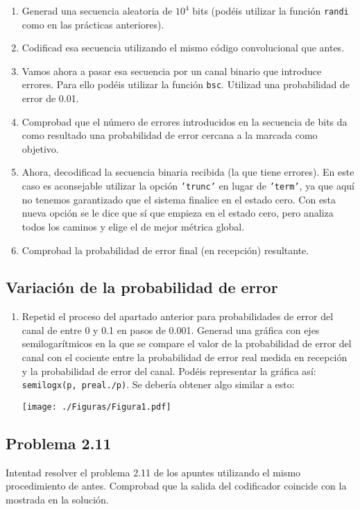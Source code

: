 \documentclass[es,practica]{uah}
\begin{document}
	\begin{enumerate}
		\item Generad una secuencia aleatoria de $10^4$ bits (podéis utilizar la función \texttt{randi} como en las prácticas anteriores).
		\item Codificad esa secuencia utilizando el mismo código convolucional que antes.
		\item Vamos ahora a pasar esa secuencia por un canal binario que introduce errores. Para ello podéis utilizar la función \texttt{bsc}. Utilizad una probabilidad de error de 0.01.
		\item Comprobad que el número de errores introducidos en la secuencia de bits da como resultado una probabilidad de error cercana a la marcada como objetivo.
		\item Ahora, decodificad la secuencia binaria recibida (la que tiene errores). En este caso es aconsejable utilizar la opción \texttt{'trunc'} en lugar de \texttt{'term'}, ya que aquí no tenemos garantizado que el sistema finalice en el estado cero. Con esta nueva opción se le dice que sí que empieza en el estado cero, pero analiza todos los caminos y elige el de mejor métrica global. 
		\item Comprobad la probabilidad de error final (en recepción) resultante. 
	\end{enumerate}

\subsection{Variación de la probabilidad de error}
	\begin{enumerate}
		\item Repetid el proceso del apartado anterior para probabilidades de error del canal de entre 0 y 0.1 en pasos de 0.001. Generad una gráfica con ejes semilogarítmicos en la que se compare el valor de la probabilidad de error del canal con el cociente entre la probabilidad de error real medida en recepción y la probabilidad de error del canal. Podéis representar la gráfica así: \texttt{semilogx(p, preal./p)}. Se debería obtener algo similar a esto:
		
		\centering\texttt{[image: ./Figuras/Figura1.pdf]}
	\end{enumerate}


\subsection{Problema 2.11}
Intentad resolver el problema 2.11 de los apuntes utilizando el mismo procedimiento de antes. Comprobad que la salida del codificador coincide con la mostrada en la solución. 
\end{document}
